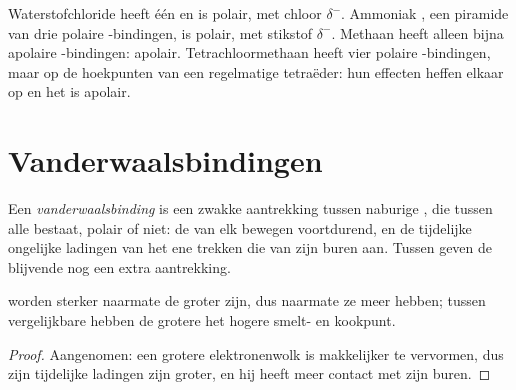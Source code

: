 \begin{example}\label{ex:g11:polarity-and-cohesion:four}
Waterstofchloride  heeft één  en is polair, met
chloor $\delta^-$. Ammoniak , een piramide van drie polaire
-bindingen, is polair, met stikstof $\delta^-$. Methaan 
heeft alleen bijna apolaire -bindingen: apolair.
Tetrachloormethaan  heeft vier polaire -bindingen, maar
op de hoekpunten van een regelmatige tetraëder: hun effecten heffen
elkaar op en het  is apolair.
\end{example}

\section{Vanderwaalsbindingen}

\begin{definition}[Vanderwaalsbinding]\label{def:g11:polarity-and-cohesion:van-der-waals}
Een \emph{vanderwaalsbinding} is een zwakke
aantrekking tussen naburige , die tussen alle 
bestaat, polair of niet: de  van elk  bewegen
voortdurend, en de tijdelijke ongelijke ladingen van het ene 
trekken die van zijn buren aan. Tussen  geven de
blijvende  nog een extra aantrekking.
\end{definition}


\begin{proposition}\label{prop:g11:polarity-and-cohesion:size}
 worden sterker naarmate de  groter zijn,
dus naarmate ze meer  hebben; tussen vergelijkbare 
hebben de grotere het hogere smelt- en kookpunt.
\end{proposition}

\begin{proof}
Aangenomen: een grotere elektronenwolk is makkelijker te vervormen, dus
zijn tijdelijke ladingen zijn groter, en hij heeft meer contact met zijn
buren.
\end{proof}

